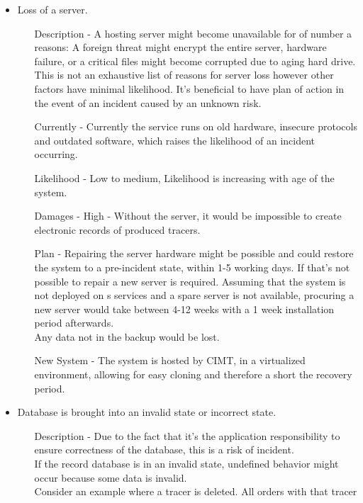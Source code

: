 \documentclass{article}
\begin{document}
\begin{itemize}
  \item Loss of a server.
  \begin{itemize}
    \item[Description] - A hosting server might become unavailable for of number
    a reasons:
    A foreign threat might encrypt the entire server, hardware failure, or a
    critical files might become corrupted due to aging hard drive.
    This is not an exhaustive list of reasons for server loss however other
    factors have minimal likelihood.
    It's beneficial to have plan of action in the event of an incident caused by
    an unknown risk.
    \item[Currently] - Currently the service runs on old hardware, insecure
    protocols and outdated software, which raises the likelihood of an incident
    occurring.
    \item[Likelihood] - Low to medium, Likelihood is increasing with age of the
    system.
    \item[Damages] - High - Without the server, it would be impossible to create
    electronic records of produced tracers.
    \item[Plan] - Repairing the server hardware might be possible and could
    restore the system to a pre-incident state, within 1-5 working days.
    If that's not possible to repair a new server is required. Assuming that the
    system is not deployed on s services and a spare server is not
    available, procuring a new server would take between 4-12 weeks with a 1
    week installation period afterwards.\\
    Any data not in the backup would be lost.
    \item[New System] - The system is hosted by CIMT, in a virtualized
    environment, allowing for easy cloning and therefore a short the recovery
    period.
  \end{itemize}
  \item Database is brought into an invalid state or incorrect state.
  \begin{itemize}
    \item[Description] - Due to the fact that it's the application
    responsibility to ensure correctness of the database, this is a risk of
    incident.\\
    If the record database is in an invalid state, undefined behavior might
    occur because some data is invalid.\\
    Consider an example where a tracer is deleted. All orders with that tracer

\end{itemize}
\end{itemize}
\end{document}
